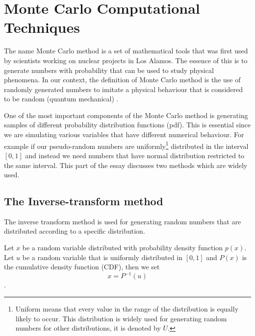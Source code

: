 \chapter{Monte Carlo Computational Techniques}

The name Monte Carlo method is a set of mathematical tools that was first used by scientists working on nuclear projects in Los Alamos.
The essence of this is to generate numbers with probability that can be used to study physical phenomena. In our context, the definition of Monte Carlo method is the use of randomly generated numbers to imitate a physical behaviour that is considered to be random (quantum mechanical) \citep{montecarlo}.


One of the most important components of the Monte Carlo method is generating samples of different probability distribution functions (pdf). This is essential since we are simulating various variables that have different numerical behaviour. For example if our pseudo-random numbers are uniformly\footnote{Uniform means that every value in the range of the distribution is equally likely to occur. This distribution is widely used for generating random numbers for other distributions, it is denoted by $U$.} distributed in the interval $[0,1]$  and instead we need numbers that have normal distribution restricted to the same interval.
This part of the essay  discusses two methods which are widely used.


\section{The Inverse-transform method}

The inverse transform method is used for generating random numbers that are distributed according to a specific distribution. 


Let $x$ be a random variable distributed with probability density function $p(x)$. Let $u$ be a random variable that is uniformly distributed in $[0,1]$ and $P(x)$ is the cumulative density function (CDF),
then we set 
\begin{equation}
x = P^{-1} (u)
\end{equation}\citep{Weinzierl}.

